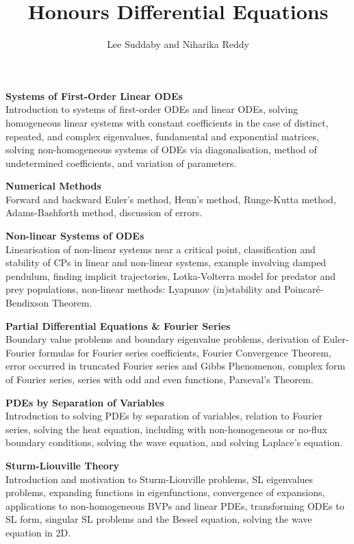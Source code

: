 \documentclass[11pt, a4paper]{article}
\title{Honours Differential Equations}
\author{Lee Suddaby and Niharika Reddy}
\numberwithin{equation}{section}
\numberwithin{figure}{section}
\numberwithin{table}{section}
\newcommand{\vb}[1]{\textbf{#1}}
\begin{document}
\maketitle

{\small
	\noindent\vb{Systems of First-Order Linear ODEs}\\
	Introduction to systems of first-order ODEs and linear ODEs, solving homogeneous linear systems with constant coefficients in the case of distinct, repeated, and complex eigenvalues, fundamental and exponential matrices, solving non-homogeneous systems of ODEs via diagonalisation, method of undetermined coefficients, and variation of parameters.
	
	\vspace{10pt}
	\noindent\vb{Numerical Methods}\\
	Forward and backward Euler's method, Heun's method, Runge-Kutta method, Adams-Bashforth method, discussion of errors.
	
	\vspace{10pt}
	\noindent\vb{Non-linear Systems of ODEs}\\
	Linearisation of non-linear systems near a critical point, classification and stability of CPs in linear and non-linear systems, example involving damped pendulum, finding implicit trajectories, Lotka-Volterra model for predator and prey populations, non-linear methods: Lyapunov (in)stability and Poincar\'{e}-Bendixson Theorem.
	
	\vspace{10pt}
	\noindent\vb{Partial Differential Equations \& Fourier Series}\\
	Boundary value problems and boundary eigenvalue problems, derivation of Euler-Fourier formulas for Fourier series coefficients, Fourier Convergence Theorem, error occurred in truncated Fourier series and Gibbs Phenomenon, complex form of Fourier series, series with odd and even functions, Parseval's Theorem.
	
	\vspace{10pt}
	\noindent\vb{PDEs by Separation of Variables}\\
	Introduction to solving PDEs by separation of variables, relation to Fourier series, solving the heat equation, including with non-homogeneous or no-flux boundary conditions, solving the wave equation, and solving Laplace's equation.
	
	\vspace{10pt}
	\noindent\vb{Sturm-Liouville Theory}\\
	Introduction and motivation to Sturm-Liouville problems, SL eigenvalues problems, expanding functions in eigenfunctions, convergence of expansions, applications to non-homogeneous BVPs and linear PDEs, transforming ODEs to SL form, singular SL problems and the Bessel equation, solving the wave equation in 2D.
	
}
\end{document}
